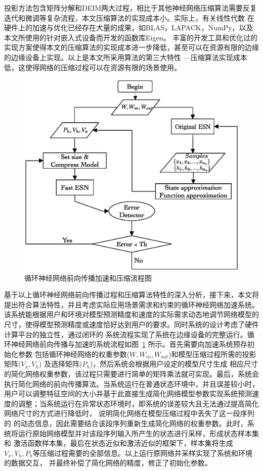 投影方法包含矩阵分解和DEIM两大过程，相比于其他神经网络压缩算法需要反复迭代和微调等复杂流程，本文压缩算法的实现成本小。实际上，有关线性代数
在硬件上的加速与优化已经存在大量的成果，如BLAS，LAPACK，NumPy，以及本文所使用的针对嵌入式设备而开发的函数库Eigen。
丰富的开发工具和优化过的实现方案使得本文的压缩算法的实现成本进一步降低，甚至可以在资源有限的边缘的边缘设备上实现。以上是本文所采用算法的第三大特性
---压缩算法实现成本低，这使得网络的压缩过程可以在资源有限的场景使用。
\begin{figure}
	\centering
	\includegraphics[width=0.6\columnwidth]{exp/Flowchart_diagram.eps}
	\caption{循环神经网络前向传播加速和压缩流程图}
	\label{fig:flowchart}
\end{figure}

基于以上循环神经网络前向传播过程和压缩算法特性的深入分析，接下来，本文将提出符合算法特性，并且考虑实际应用场景需求和约束的循环神经网络加速系统。
该系统能根据用户和环境对模型预测精度和速度的实际需求动态地调节网络模型的尺寸，使得模型预测精度或速度恰好达到用户的要求。同时系统的设计考虑了硬件计算平台的独立性，通过闭环的
系统流程实现了系统在边缘设备的完整运行。循环神经网络前向传播与加速的系统流程如图~\ref{fig:flowchart} 所示。首先需要向加速系统预存初始化参数
包括循环神经网络的权重参数(\(W,W_{in},W_{out}\))和模型压缩过程所需的投影矩阵(\(V_x,V_h\)) 及选择矩阵(\(P_h\))，然后系统会根据用户设定的模型尺寸生成
相应尺寸的简化网络权重参数，该过程只需要进行简单的矩阵乘法就可实现。最后，系统会执行简化网络的前向传播算法。当系统运行在普通状态环境中，并且误差较小时，
用户可以调整特征空间的大小并基于此直接生成简化网络模型参数实现系统预测速度的调整；当系统运行在异常状态环境时，即系统的误差较大且无法通过提高简化网络尺寸的方式进行降低时，
说明简化网络在模型压缩过程中丢失了这一段序列的
的动态信息，因此需要结合该段序列重新生成简化网络的权重参数。此时，系统将运行原始网络模型并对该段序列输入所产生的状态进行采样，形成状态样本集和
激活函数样本集，最后在状态近似和激活近似的框架下，样本集将生成\(V_x,V_h,P_h\)等压缩过程需要的全部信息。以上运行原网络并采样实现了系统和环境的数据交互，
并最终补偿了简化网络的精度，修正了初始化参数。
